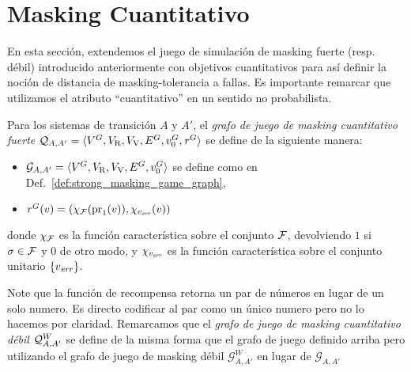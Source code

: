 \section{Masking Cuantitativo} \label{sec:QuantMask}
En esta sección, extendemos el juego de simulación de masking fuerte (resp. débil) introducido anteriormente con objetivos cuantitativos para así definir la noción de distancia de masking-tolerancia a fallas.
Es importante remarcar que utilizamos el atributo  ``cuantitativo'' en un sentido no probabilista.
\begin{definition}  
  Para los sistemas de transición $A$ y $A'$, el \emph{grafo de juego de masking cuantitativo fuerte} 
  $\mathcal{Q}_{A, A'} = \langle V^G, V_{\mathrm{R}}, V_{\mathrm{V}}, E^G,  v_0^G,  \mathit{r}^G \rangle$ se define de la siguiente manera:
 
\begin{itemize}
\item
  $\mathcal{G}_{A, A'}=\langle V^G, V_{\mathrm{R}}, V_{\mathrm{V}}, E^G, v_0^G \rangle$ se define como en Def.~\ref{def:strong_masking_game_graph},
\item
  $ \mathit{r}^G(v) = (\chi_{\mathcal{F}}(\operatorname{pr}_{1}(v)), \chi_{v_{\mathit{err}}}(v))$

\end{itemize}
%
donde $\chi_{\mathcal{F}}$ es la función característica sobre el conjunto $\mathcal{F}$, devolviendo $1$ si $\sigma \in \mathcal{F}$ y $0$ de otro modo, y $\chi_{v_{\mathit{err}}}$ es la función característica sobre el conjunto unitario $\{v_{\mathit{err}}\}$.
\end{definition}
Note que la función de recompensa retorna un par de números en lugar de un solo numero. Es directo codificar al par como un único numero pero no lo hacemos por claridad. Remarcamos que el
\emph{grafo de juego de masking cuantitativo débil} $\mathcal{Q}^W_{A,A'}$
se define de la misma forma que el grafo de juego definido arriba pero utilizando el grafo de juego de masking débil $\mathcal{G}^W_{A, A'}$ en lugar de 
$\mathcal{G}_{A, A'}$


